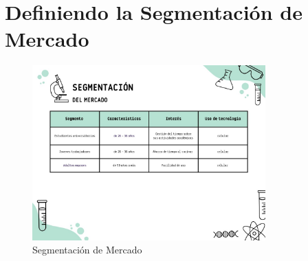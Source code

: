 \documentclass{article}
\begin{document}
\section*{Definiendo la Segmentación de Mercado}

\begin{figure}[h!]
    \centering
    \includegraphics[width=0.8\textwidth]{assets/segmentaciion.jpeg}
    \caption{Segmentación de Mercado}
    \label{fig:perfil_usuario}
\end{figure}
\end{document}
